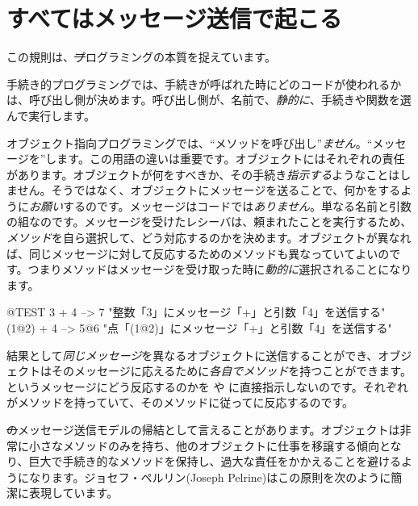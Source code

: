 \documentclass[a4paper,10pt,twoside]{book}
\begin{document}

\section{すべてはメッセージ送信で起こる}


この規則は、\st プログラミングの本質を捉えています。

手続き的プログラミングでは、手続きが呼ばれた時にどのコードが使われるかは、呼び出し側が決めます。呼び出し側が、名前で、\emph{静的に}、手続きや関数を選んで実行します。

オブジェクト指向プログラミングでは、``メソッドを呼び出し''\emph{ません}。``メッセージを''します。この用語の違いは重要です。オブジェクトにはそれぞれの責任があります。オブジェクトが何をすべきか、その手続き\emph{指示する}ようなことはしません。そうではなく、オブジェクトにメッセージを送ることで、何かをするように\emph{お願い}するのです。メッセージはコードでは\emph{ありません}。単なる名前と引数の組なのです。メッセージを受けたレシーバは、頼まれたことを実行するため、\emph{メソッド}を自ら選択して、どう対応するのかを決めます。オブジェクトが異なれば、同じメッセージに対して反応するためのメソッドも異なっていてよいのです。つまりメソッドはメッセージを受け取った時に\emph{動的に}選択されることになります。

\begin{code}{@TEST}
3 + 4         --> 7          "整数「3」にメッセージ「+」と引数「4」を送信する"
(1@2) + 4 --> 5@6    "点「(1@2)」にメッセージ「+」と引数「4」を送信する"
\end{code}

\noindent
結果として\emph{同じメッセージ}を異なるオブジェクトに送信することができ、オブジェクトはそのメッセージに応えるために\emph{各自でメソッド}を持つことができます。というメッセージにどう反応するのかを や に直接指示しないのです。それぞれが\ct{+}メソッドを持っていて、そのメソッドに従ってに反応するのです。

\st のメッセージ送信モデルの帰結として言えることがあります。オブジェクトは非常に小さなメソッドのみを持ち、他のオブジェクトに仕事を移譲する傾向となり、巨大で手続き的なメソッドを保持し、過大な責任をかかえることを避けるようになります。ジョセフ・ペルリン(Joseph Pelrine)はこの原則を次のように簡潔に表現しています。
\end{document}
